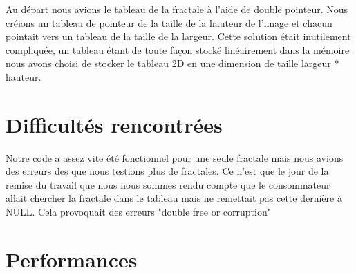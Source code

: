 \documentclass[10pt,a4paper]{article}
\begin{document}
Au départ nous avions le tableau de la fractale à l'aide de double pointeur.
Nous créions un tableau de pointeur de la taille de la hauteur de l'image et chacun pointait vers un tableau de la taille de la largeur.
Cette solution était inutilement compliquée, un tableau étant de toute façon stocké linéairement dans la mémoire nous avons choisi de stocker le tableau 2D en une dimension de taille largeur * hauteur.

\section{Difficultés rencontrées}

Notre code a assez vite été fonctionnel pour une seule fractale mais nous avions des erreurs des que nous testions plus de fractales. Ce n'est que le jour de la remise du travail que nous nous sommes rendu compte que le consommateur allait chercher la fractale dans le tableau mais ne remettait pas cette dernière à NULL. Cela provoquait des erreurs "double free or corruption" 

\section{Performances}
\end{document}
